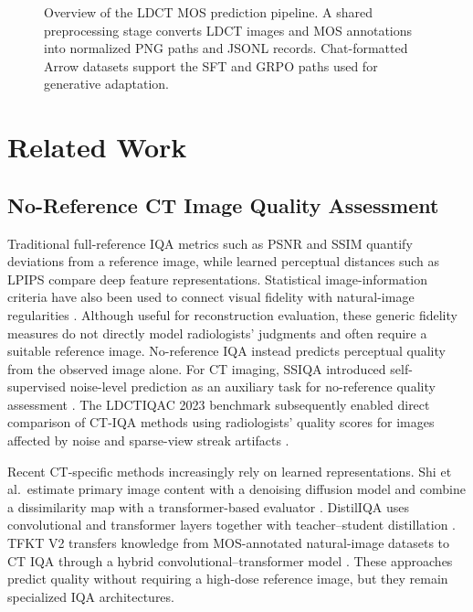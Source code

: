 \documentclass[10pt,twocolumn,letterpaper]{article}
\begin{document}
\begin{figure}[t]
  \centering
  \resizebox{0.98\textwidth}{!}{}
  \caption{Overview of the LDCT MOS prediction pipeline. A shared preprocessing stage converts LDCT images and MOS annotations into normalized PNG paths and JSONL records. Chat-formatted Arrow datasets support the SFT and GRPO paths used for generative adaptation.}
  \label{fig:training-pipeline}
\end{figure}

\section{Related Work}
\subsection{No-Reference CT Image Quality Assessment}
Traditional full-reference IQA metrics such as PSNR and SSIM \cite{wang2004image} quantify deviations from a reference image, while learned perceptual distances such as LPIPS \cite{zhang2018unreasonable} compare deep feature representations. Statistical image-information criteria have also been used to connect visual fidelity with natural-image regularities \cite{sheikh2006statistical}. Although useful for reconstruction evaluation, these generic fidelity measures do not directly model radiologists' judgments and often require a suitable reference image. No-reference IQA instead predicts perceptual quality from the observed image alone. For CT imaging, SSIQA introduced self-supervised noise-level prediction as an auxiliary task for no-reference quality assessment \cite{imran2021ssiqa}. The LDCTIQAC 2023 benchmark subsequently enabled direct comparison of CT-IQA methods using radiologists' quality scores for images affected by noise and sparse-view streak artifacts \cite{lee2025low}.

Recent CT-specific methods increasingly rely on learned representations. Shi et al.\ estimate primary image content with a denoising diffusion model and combine a dissimilarity map with a transformer-based evaluator \cite{shi2024blind}. DistilIQA uses convolutional and transformer layers together with teacher--student distillation \cite{baldeoncalisto2024distiliqa}. TFKT V2 transfers knowledge from MOS-annotated natural-image datasets to CT IQA through a hybrid convolutional--transformer model \cite{rifa2025tfkt}. These approaches predict quality without requiring a high-dose reference image, but they remain specialized IQA architectures.
\end{document}
